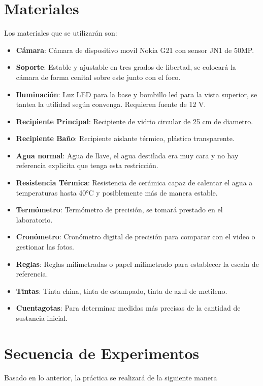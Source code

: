 \documentclass[11pt]{article}
\begin{document}
\section*{Materiales}
Los materiales que se utilizarán son:
\begin{itemize}
    \item \textbf{Cámara}: Cámara de dispositivo movil Nokia G21 con sensor JN1 de 50MP.
    \item \textbf{Soporte}: Estable y ajustable en tres grados de libertad, se colocará la cámara de forma cenital sobre este junto con el foco.
    \item \textbf{Iluminación}: Luz LED para la base y bombillo led para la vista superior, se tantea la utilidad según convenga. Requieren fuente de 12 V.
    \item \textbf{Recipiente Principal}: Recipiente de vidrio circular de 25 cm de diametro.
    \item \textbf{Recipiente Baño}: Recipiente aislante térmico, plástico transparente.
    \item \textbf{Agua normal}: Agua de llave, el agua destilada era muy cara y no hay referencia explicita que tenga esta restricción.
    \item \textbf{Resistencia Térmica}: Resistencia de cerámica capaz de calentar el agua a temperaturas hasta 40°C y posiblemente más de manera estable.
    \item \textbf{Termómetro}: Termómetro de precisión, se tomará prestado en el laboratorio.
    \item\textbf{Cronómetro}: Cronómetro digital de precisión para comparar con el video o gestionar las fotos.
    \item\textbf{Reglas}: Reglas milimetradas o papel milimetrado para establecer la escala de referencia.
    \item\textbf{Tintas}: Tinta china, tinta de estampado, tinta de azul de metileno.
    \item \textbf{Cuentagotas}: Para determinar medidas más precisas de la cantidad de sustancia inicial.
\end{itemize}

\section*{Secuencia de Experimentos}
Basado en lo anterior, la práctica se realizará de la siguiente manera
\end{document}
